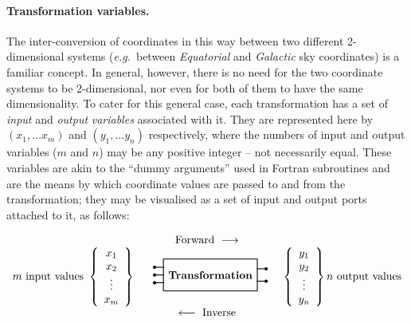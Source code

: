 \documentclass[twoside,11pt]{article}
\renewcommand{\_}{\texttt{\symbol{95}}}
\begin{document}
\paragraph{Transformation variables.}
The inter-conversion of coordinates in this way between two different
2-dimensional systems (\emph{e.g.}\ between \emph{Equatorial} and
\emph{Galactic} sky coordinates) is a familiar concept.
In general, however, there is no need for the two coordinate systems to be
2-dimensional, nor even for both of them to have the same dimensionality.
To cater for this general case, each transformation has a set of \emph{input}
and \emph{output} \emph{variables} associated with it.
They are represented here by \mbox{$(x_{1},\ldots x_{m})$} and
\mbox{$(y_{1},\ldots y_{n})$} respectively, where the numbers of input and
output variables ($m$ and $n$) may be any positive integer -- not
necessarily equal.
These variables are akin to the ``dummy arguments'' used in Fortran
subroutines and are the means by which coordinate values are passed to and
from the transformation; they may be visualised as a set of input and output
ports attached to it, as follows:

\begin{displaymath}
\begin{array}{c}
\mbox{Forward } \longrightarrow \\

m \mbox{ input values }
\left\{ \begin{array}{c} x_{1} \\ x_{2} \\ \vdots \\ x_{m} \end{array} \right\}

\begin{array}{c}\mbox{
\setlength{\unitlength}{1mm}
\thicklines
\begin{picture}(40, 10)(-20,-5)
\put(-15,-5){\framebox(30,10){\textbf{Transformation}}}
\multiput(-15,-2.5)(0,2.5){3}{\line(-1,0){3}}
\multiput(-18,-2.5)(0,2.5){3}{\circle*{1}}
\multiput(15,-2)(0,4){2}{\line(1,0){3}}
\multiput(18,-2)(0,4){2}{\circle*{1}}
\end{picture}
} \end{array}

\left\{ \begin{array}{c} y_{1} \\ y_{2} \\ \vdots \\ y_{n} \end{array} \right\}
n \mbox{ output values}

\\ \longleftarrow \mbox{ Inverse}
\end{array}
\end{displaymath}
\end{document}
